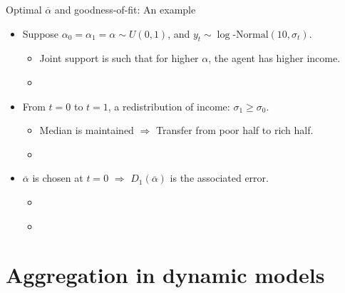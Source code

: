 \documentclass[10pt, handout]{beamer}
\begin{document}
\begin{frame}[label=RA-Example]{Optimal $\overline{\alpha}$ and goodness-of-fit: An example}
	\vfill
	\begin{itemize}
		\item Suppose $\alpha_{0} = \alpha_{1} = \alpha \sim U(0,1)$, and $y_{t} \sim \log\text{-Normal}(10, \sigma_{t})$.\vspace{1ex}
			\begin{itemize}
				\item Joint support is such that for higher $\alpha$, the agent has higher income. \vspace{1ex}
				\item \hyperlink{SupportRA}{}
			\end{itemize}\vfill
		
		\item From $t = 0$ to $t = 1$, a redistribution of income: $\sigma_{1} \geq \sigma_{0}$.\vspace{1ex}
			\begin{itemize}
				\item Median is maintained $\Rightarrow$ Transfer from poor half to rich half. \vspace{1ex}
				\item \hyperlink{DensityRA}{} 
			\end{itemize} \vfill
			
		\item $\overline{\alpha}$ is chosen at $t = 0$ $\Rightarrow$ $D_{1}(\overline{\alpha})$ is the associated error.\vspace{1ex}
			\begin{itemize}
				\item \hyperlink{alphaBar-RA}{} \vspace{1ex}
				\item \hyperlink{Dt-RA}{} 
			\end{itemize} \vfill

	\end{itemize}

\end{frame}



\section{Aggregation in dynamic models}
\end{document}
